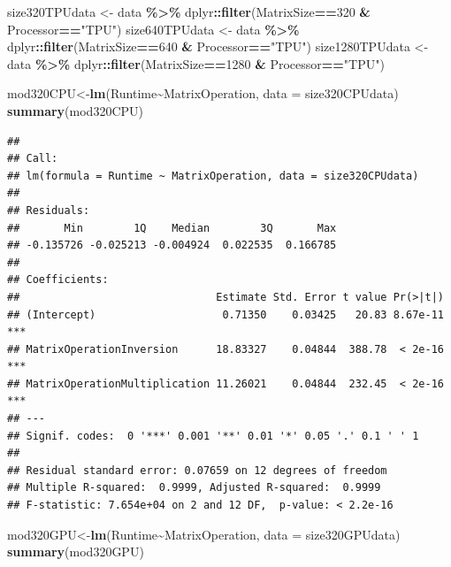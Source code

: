 \documentclass[
]{article}
\newenvironment{Shaded}{\begin{snugshade}}{\end{snugshade}}
\newcommand{\DataTypeTok}[1]{\textcolor[rgb]{0.13,0.29,0.53}{#1}}
\newcommand{\DecValTok}[1]{\textcolor[rgb]{0.00,0.00,0.81}{#1}}
\newcommand{\KeywordTok}[1]{\textcolor[rgb]{0.13,0.29,0.53}{\textbf{#1}}}
\newcommand{\NormalTok}[1]{#1}
\newcommand{\OperatorTok}[1]{\textcolor[rgb]{0.81,0.36,0.00}{\textbf{#1}}}
\newcommand{\StringTok}[1]{\textcolor[rgb]{0.31,0.60,0.02}{#1}}
\begin{document}
\begin{Shaded}
\begin{Highlighting}[]
\NormalTok{size320TPUdata \textless{}{-}}\StringTok{ }\NormalTok{data }\OperatorTok{\%\textgreater{}\%}\StringTok{ }\NormalTok{dplyr}\OperatorTok{::}\KeywordTok{filter}\NormalTok{(MatrixSize}\OperatorTok{==}\DecValTok{320} \OperatorTok{\&}\StringTok{ }\NormalTok{Processor}\OperatorTok{==}\StringTok{"TPU"}\NormalTok{)}
\NormalTok{size640TPUdata \textless{}{-}}\StringTok{ }\NormalTok{data }\OperatorTok{\%\textgreater{}\%}\StringTok{ }\NormalTok{dplyr}\OperatorTok{::}\KeywordTok{filter}\NormalTok{(MatrixSize}\OperatorTok{==}\DecValTok{640} \OperatorTok{\&}\StringTok{ }\NormalTok{Processor}\OperatorTok{==}\StringTok{"TPU"}\NormalTok{)}
\NormalTok{size1280TPUdata \textless{}{-}}\StringTok{ }\NormalTok{data }\OperatorTok{\%\textgreater{}\%}\StringTok{ }\NormalTok{dplyr}\OperatorTok{::}\KeywordTok{filter}\NormalTok{(MatrixSize}\OperatorTok{==}\DecValTok{1280} \OperatorTok{\&}\StringTok{ }\NormalTok{Processor}\OperatorTok{==}\StringTok{"TPU"}\NormalTok{)}

\NormalTok{mod320CPU\textless{}{-}}\KeywordTok{lm}\NormalTok{(Runtime}\OperatorTok{\textasciitilde{}}\NormalTok{MatrixOperation, }\DataTypeTok{data =}\NormalTok{ size320CPUdata)}
\KeywordTok{summary}\NormalTok{(mod320CPU)}
\end{Highlighting}
\end{Shaded}

\begin{verbatim}
## 
## Call:
## lm(formula = Runtime ~ MatrixOperation, data = size320CPUdata)
## 
## Residuals:
##       Min        1Q    Median        3Q       Max 
## -0.135726 -0.025213 -0.004924  0.022535  0.166785 
## 
## Coefficients:
##                               Estimate Std. Error t value Pr(>|t|)    
## (Intercept)                    0.71350    0.03425   20.83 8.67e-11 ***
## MatrixOperationInversion      18.83327    0.04844  388.78  < 2e-16 ***
## MatrixOperationMultiplication 11.26021    0.04844  232.45  < 2e-16 ***
## ---
## Signif. codes:  0 '***' 0.001 '**' 0.01 '*' 0.05 '.' 0.1 ' ' 1
## 
## Residual standard error: 0.07659 on 12 degrees of freedom
## Multiple R-squared:  0.9999, Adjusted R-squared:  0.9999 
## F-statistic: 7.654e+04 on 2 and 12 DF,  p-value: < 2.2e-16
\end{verbatim}

\begin{Shaded}
\begin{Highlighting}[]
\NormalTok{mod320GPU\textless{}{-}}\KeywordTok{lm}\NormalTok{(Runtime}\OperatorTok{\textasciitilde{}}\NormalTok{MatrixOperation, }\DataTypeTok{data =}\NormalTok{ size320GPUdata)}
\KeywordTok{summary}\NormalTok{(mod320GPU)}
\end{Highlighting}
\end{Shaded}
\end{document}
